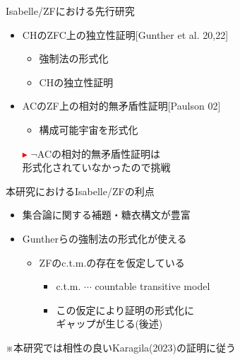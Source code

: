 \documentclass[17pt,aspectratio=169]{beamer}
\begin{document}


\begin{frame}{Isabelle/ZFにおける先行研究}
 
    \begin{itemize}[itemsep=8pt]
        \vspace{10pt}
        \item CHのZFC上の独立性証明{\small [Gunther et al. 20,22]}
            \vspace{3pt}
              {\small \begin{itemize}
                \item 強制法の形式化 %
                \item CHの独立性証明
              \end{itemize} }

        \item ACのZF上の相対的無矛盾性証明{\small [Paulson 02]}
              {\small \begin{itemize}
                      \item 構成可能宇宙を形式化
                  \end{itemize} }
    \end{itemize}
    \begin{itemize}
        \item [\textcolor{red}{$\blacktriangleright$}] $\neg$ACの相対的無矛盾性証明は\\
        形式化されていなかったので挑戦
    \end{itemize}
\end{frame}

\begin{frame}{本研究におけるIsabelle/ZFの利点}
    \begin{itemize}
        \item 集合論に関する補題・糖衣構文が豊富
        \item Guntherらの強制法の形式化が使える
        {\small \begin{itemize}
            \item ZFのc.t.m.の存在を仮定している
            \begin{itemize}
                \item c.t.m. $\cdots$ countable transitive model
                \item この仮定により証明の形式化に\\ギャップが生じる(後述)
            \end{itemize}
        \end{itemize}}
    \end{itemize}
    ※本研究では相性の良いKaragila(2023)の証明に従う
\end{frame}
\end{document}
